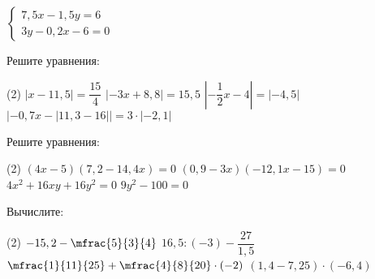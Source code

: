 \begin{class}[number=7]
\begin{listofex}
\begin{tasks}
			\task \( \begin{cases} 7,5x-1,5y=6 \\ 3y-0,2x-6=0 \end{cases} \)
		\end{tasks}
		\item Решите уравнения:
		\begin{tasks}(2)
			\task \( |x-11,5|=\dfrac{ 15 }{ 4 } \)
			\task \( |-3x+8,8|=15,5 \)
			\task \( \left| -\dfrac{ 1 }{ 2 }x-4 \right|=|-4,5| \)
			\task \( |-0,7x-|11,3-16||=3\cdot |-2,1| \)
		\end{tasks}
		\item Решите уравнения:
		\begin{tasks}(2)
			\task \( (4x-5)(7,2-14,4x)=0 \)
			\task \( (0,9-3x)(-12,1x-15)=0 \)
			\task \( 4x^2+16xy+16y^2=0 \)
			\task \( 9y^2-100=0 \)
		\end{tasks}
		\item Вычислите:
		\begin{tasks}(2)
			\task \( -15,2-\mfrac{5 }{3 }{4 } \)
			\task \( 16,5 : (-3) -\dfrac{ 27 }{ 1,5 } \)
			\task \( \mfrac{1 }{ 11}{25 } + \mfrac{4 }{8 }{20 } \cdot (-2) \)
			\task \( (1,4-7,25) \cdot (-6,4) \)
		\end{tasks}
	\end{listofex}
\end{class}


